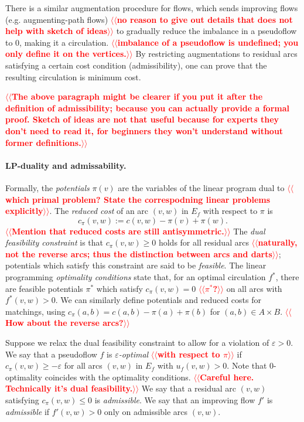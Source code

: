 \documentclass[11pt]{article}
\makeatletter
\def\eps{\varepsilon}
\theoremstyle{plain}
\def\n@te#1{\textsf{\boldmath \textbf{$\langle\!\langle$#1$\rangle\!\rangle$}}\leavevmode}
\def\note#1{\textcolor{red}{\n@te{#1}}}
\makeatother
\begin{document}
There is a similar augmentation procedure for flows, which sends improving
flows (e.g. augmenting-path flows) \note{no reason to give out details that does not help with sketch of ideas} to gradually reduce the imbalance in a
pseudoflow to 0, making it a circulation. \note{imbalance of a pseudoflow is undefined; you only define it on the vertices.}
By restricting augmentations to residual arcs satisfying a certain cost
condition (admissibility), one can prove that the resulting circulation is
minimum cost.

\note{The above paragraph might be clearer if you put it after the definition of admissibility; because you can actually provide a formal proof.  Sketch of ideas are not that useful because for experts they don't need to read it, for beginners they won't understand without former definitions.}

\paragraph{LP-duality and admissability.}
Formally, the
\emph{potentials} $\pi(v)$ are the variables of the linear program dual to \note{which primal problem? State the correspodning linear problems explicitly}.
The \emph{reduced cost} of an arc $(v, w)$ in $E_f$ with respect to $\pi$ is
\[
c_\pi(v, w) := c(v, w) - \pi(v) + \pi(w).
\]
\note{Mention that reduced costs are still antisymmetric.}
The \emph{dual feasibility constraint} is that $c_\pi(v, w) \geq 0$ holds for all
residual arcs \note{naturally, not the reverse arcs; thus the distinction between arcs and darts}; potentials which satisfy this constraint are said to be \emph{feasible}.
The linear programming \emph{optimality conditions} state that, for an optimal
circulation $f^*$, there are feasible potentials $\pi^*$ which satisfy
$c_\pi(v, w) = 0$ \note{$\pi^*$?} on all arcs with $f^*(v, w) > 0$.
We can similarly define potentials and reduced costs for matchings, using
$c_\pi(a, b) = c(a, b) - \pi(a) + \pi(b)$ for $(a, b) \in A \times B$. \note{How about the reverse arcs?}

Suppose we relax the dual feasibility constraint to allow for a violation of
$\eps > 0$.
We say that a pseudoflow $f$ is \emph{$\eps$-optimal} \note{with respect to $\pi$} if
$c_\pi(v, w) \geq -\eps$ for all arcs $(v, w)$ in $E_f$ with $u_f(v, w) > 0$.
Note that 0-optimality coincides with the optimality conditions. \note{Careful here.  Technically it's dual feasibility.}
We say that a residual arc $(v ,w)$ satisfying $c_\pi(v, w) \leq 0$ is \emph{admissible}.
We say that an improving flow $f'$ is \emph{admissible} if $f'(v, w) > 0$
only on admissible arcs $(v, w)$.
\end{document}
